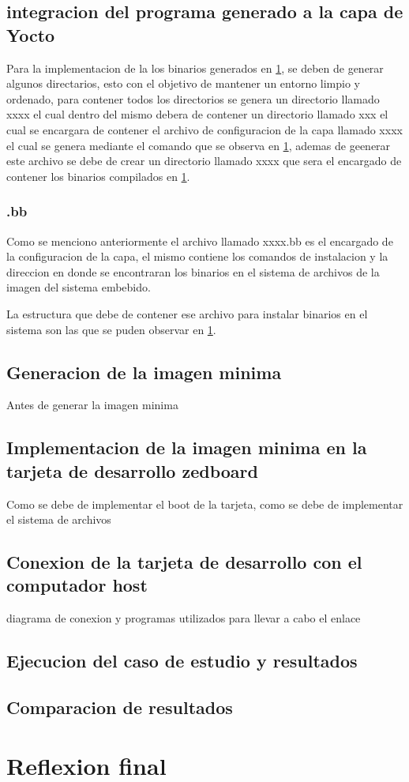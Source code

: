 \subsection{integracion del programa generado a la capa de Yocto}

Para la implementacion de la los binarios generados en \ref{}, se deben de generar algunos directarios, esto con el objetivo de mantener un entorno limpio y ordenado, para contener todos los directorios se genera un directorio llamado xxxx el cual dentro del mismo debera de contener un directorio llamado xxx el cual se encargara de contener el archivo de configuracion de la capa llamado xxxx el cual se genera mediante el comando que se observa en \ref{}, ademas de geenerar este archivo se debe de crear un directorio llamado xxxx que sera el encargado de contener los binarios compilados en \ref{}.

\subsubsection{.bb}

Como se menciono anteriormente el archivo llamado xxxx.bb es el encargado de la configuracion de la capa, el mismo contiene los comandos de instalacion y la direccion en donde se encontraran los binarios en el sistema de archivos de la imagen del sistema embebido.

La estructura que debe de contener ese archivo para instalar binarios en el sistema son las que se puden observar en \ref{}.

\subsection{Generacion de la imagen minima}

Antes de generar la imagen minima 

\subsection{Implementacion de la imagen minima en la tarjeta de desarrollo zedboard}
Como se debe de implementar el boot de la tarjeta, como se debe de implementar el  sistema de archivos
\subsection{Conexion de la tarjeta de desarrollo con el computador host}
diagrama de conexion y programas utilizados para llevar a cabo el enlace

\subsection{Ejecucion del caso de estudio y resultados}

\subsection{Comparacion de resultados}

\section{Reflexion final}